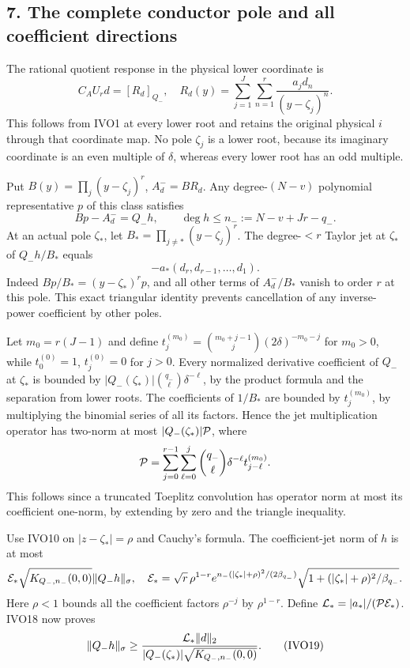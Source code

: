 \subsection{7. The complete conductor pole and all coefficient directions}\label{the-complete-conductor-pole-and-all-coefficient-directions}

The rational quotient response in the physical lower coordinate is \[
C_AU_rd=[R_d]_{Q_-},\quad
R_d(y)=\sum_{j=1}^J\sum_{n=1}^r\frac{a_jd_n}{(y-\zeta_j)^n}.
\tag{IVO16}
\] This follows from IVO1 at every lower root and retains the original physical \(i\) through that coordinate map. No pole \(\zeta_j\) is a lower root, because its imaginary coordinate is an even multiple of \(\delta\), whereas every lower root has an odd multiple.

Put \(B(y)=\prod_j(y-\zeta_j)^r\), \(A_d^-=BR_d\). Any degree-\((N-v)\) polynomial representative \(p\) of this class satisfies \[
Bp-A_d^-=Q_-h,\qquad
\deg h\le n_-:=N-v+Jr-q_-.
\tag{IVO17}
\] At an actual pole \(\zeta_*\), let \(B_*=\prod_{j\ne*}(y-\zeta_j)^r\). The degree-\(<r\) Taylor jet at \(\zeta_*\) of \(Q_-h/B_*\) equals \[
-a_*(d_r,d_{r-1},\ldots,d_1).
\tag{IVO18}
\] Indeed \(Bp/B_*=(y-\zeta_*)^rp\), and all other terms of \(A_d^-/B_*\) vanish to order \(r\) at this pole. This exact triangular identity prevents cancellation of any inverse-power coefficient by other poles.

Let \(m_0=r(J-1)\) and define \(t_j^{(m_0)}=\binom{m_0+j-1}{j}(2\delta)^{-m_0-j}\) for \(m_0>0\), while \(t_0^{(0)}=1\), \(t_j^{(0)}=0\) for \(j>0\). Every normalized derivative coefficient of \(Q_-\) at \(\zeta_*\) is bounded by \(|Q_-(\zeta_*)|\binom{q_-}{\ell}\delta^{-\ell}\), by the product formula and the separation from lower roots. The coefficients of \(1/B_*\) are bounded by \(t_j^{(m_0)}\), by multiplying the binomial series of all its factors. Hence the jet multiplication operator has two-norm at most \(|Q_-(\zeta_*)|{\cal P}\), where \[
{\cal P}=\sum_{j=0}^{r-1}\sum_{\ell=0}^j
\binom{q_-}{\ell}\delta^{-\ell}t_{j-\ell}^{(m_0)}.
\] This follows since a truncated Toeplitz convolution has operator norm at most its coefficient one-norm, by extending by zero and the triangle inequality.

Use IVO10 on \(|z-\zeta_*|=\rho\) and Cauchy's formula. The coefficient-jet norm of \(h\) is at most \[
{\cal E}_*\sqrt{K_{Q_-,n_-}(0,0)}\|Q_-h\|_\sigma,\quad
{\cal E}_*=\sqrt r\,\rho^{1-r}
e^{n_-(|\zeta_*|+\rho)^2/(2\beta_{q_-})}
\sqrt{1+(|\zeta_*|+\rho)^2/\beta_{q_-}}.
\] Here \(\rho<1\) bounds all the coefficient factors \(\rho^{-j}\) by \(\rho^{1-r}\). Define \({\cal L}_*=|a_*|/({\cal P}{\cal E}_*)\). IVO18 now proves \[
\|Q_-h\|_\sigma\ge
\frac{{\cal L}_*\|d\|_2}
{|Q_-(\zeta_*)|\sqrt{K_{Q_-,n_-}(0,0)}}.
\tag{IVO19}
\]

